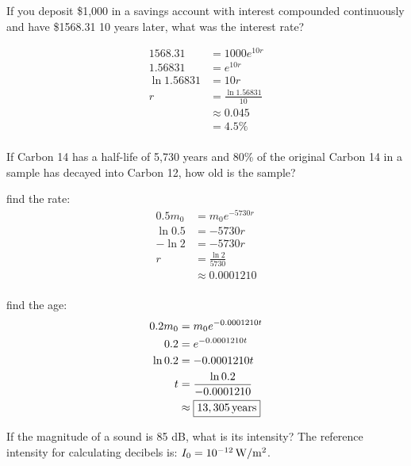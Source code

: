 \documentclass[fleqn,addpoints]{exam}
\begin{document}
\begin{questions}
    \question[7]
      If you deposit \$1,000 in a savings account with interest compounded continuously and have \$1568.31 10 years later,
      what was the interest rate?

      \begin{solution}
        \begin{align*}
          1568.31     & = 1000 e^{10 r} \\
          1.56831     & = e^{10 r} \\
          \ln 1.56831 & = 10 r \\
          r           & = \frac{\ln 1.56831}{10} \\
                      & \approx 0.045 \\
                      & = \boxed{ 4.5\% } \\
        \end{align*}
      \end{solution}

    \question[10]
      If Carbon 14 has a half-life of 5,730 years and 80\% of the original Carbon 14 in a sample has decayed into Carbon
      12, how old is the sample?

      \begin{solution}
        find the rate:
        \begin{align*}
          0.5 m_0 & = m_0 e^{-5730r} \\
          \ln 0.5 & = -5730r \\
          - \ln 2 & = -5730r \\
          r       & = \frac{\ln 2}{5730} \\
                  & \approx 0.0001210 \\
        \end{align*}

        find the age:
        \begin{align*}
          0.2 m_0 & = m_0 e^{-0.0001210 t} \\
          0.2     & = e^{-0.0001210 t} \\
          \ln 0.2 & = -0.0001210 t \\
          t       & = \frac{\ln 0.2}{-0.0001210} \\
                  & \approx \boxed{ \unit[13,305]{years} } \\
        \end{align*}
      \end{solution}

    \question[5]
      If the magnitude of a sound is 85 dB, what is its intensity?  The reference intensity for calculating decibels is:
      $I_0 = \unit[10^{-12}]{W/m^2}$.
      

\end{questions}
\end{document}
